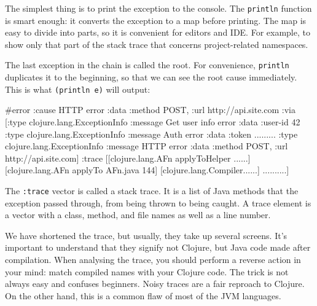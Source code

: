 The simplest thing is to print the exception to the console. The \verb|println| function is smart enough: it converts the exception to a map before printing. The map is easy to divide into parts, so it is convenient for editors and IDE. For example, to show only that part of the stack trace that concerns project-related namespaces.

The last exception in the chain is called the root. For convenience, \verb|println| duplicates it to the beginning, so that we can see the root cause immediately. This is what \verb|(println e)| will output:


\ifx\DEVICETYPE\MOBILE

\begin{clojure}
#error {
 :cause HTTP error
 :data {:method POST,
        :url http://api.site.com}
 :via
 [{:type clojure.lang.ExceptionInfo
   :message Get user info error
   :data {:user-id 42}}
  {:type clojure.lang.ExceptionInfo
   :message Auth error
   :data {:token .........}}
  {:type clojure.lang.ExceptionInfo
   :message HTTP error
   :data {:method POST,
          :url http://api.site.com}}]
 :trace
 [[clojure.lang.AFn applyToHelper ......]
  [clojure.lang.AFn applyTo AFn.java 144]
  [clojure.lang.Compiler......]
  ..........]}
\end{clojure}

\else


\fi


The \verb|:trace| vector is called a stack trace. It is a list of Java methods that the exception passed through, from being thrown to being caught. A trace element is a vector with a class, method, and file names as well as a line number.

We have shortened the trace, but usually, they take up several screens. It's important to understand that they signify not Clojure, but Java code made after compilation. When analysing the trace, you should perform a reverse action in your mind: match compiled names with your Clojure code. The trick is not always easy and confuses beginners. Noisy traces are a fair reproach to Clojure. On the other hand, this is a common flaw of most of the JVM languages.

